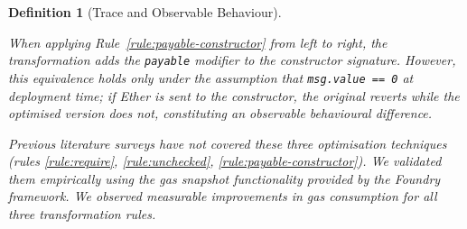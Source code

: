 \documentclass[manuscript,screen,review]{acmart}
\newtheorem{definition}{Definition}
\begin{document}
\begin{definition}[Trace and Observable Behaviour]
\begin{refactoring}[h!]
\end{refactoring}

When applying Rule~\ref{rule:payable-constructor} from left to right, the transformation adds the \texttt{payable} modifier to the constructor signature. However, this equivalence holds only under the assumption that \texttt{msg.value == 0} at deployment time; if Ether is sent to the constructor, the original reverts while the optimised version does not, constituting an observable behavioural difference.

Previous literature surveys have not covered these three optimisation techniques (rules \ref{rule:require}, \ref{rule:unchecked}, \ref{rule:payable-constructor}). We validated them empirically using the gas snapshot functionality provided by the Foundry framework. We observed measurable improvements in gas consumption for all three transformation rules.


\end{definition}
\end{document}
